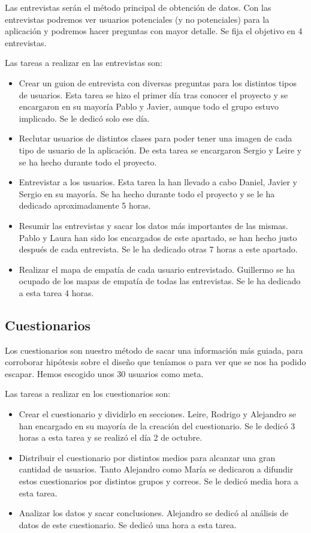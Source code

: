 Las entrevistas serán el método principal de obtención de datos. Con las entrevistas podremos ver usuarios potenciales (y no potenciales) para la aplicación y podremos hacer preguntas con mayor detalle. Se fija el objetivo en 4 entrevistas.

Las tareas a realizar en las entrevistas son:
\begin{itemize}
    \item Crear un guion de entrevista con diversas preguntas para los distintos tipos de usuarios. Esta tarea se hizo el primer día tras conocer el proyecto y se encargaron en su mayoría Pablo y Javier, aunque todo el grupo estuvo implicado. Se le dedicó solo ese día.
    \item Reclutar usuarios de distintos clases para poder tener una imagen de cada tipo de usuario de la aplicación. De esta tarea se encargaron Sergio y Leire y se ha hecho durante todo el proyecto.
    \item Entrevistar a los usuarios. Esta tarea la han llevado a cabo Daniel, Javier y Sergio en su mayoría. Se ha hecho durante todo el proyecto y se le ha dedicado aproximadamente 5 horas.
    \item Resumir las entrevistas y sacar los datos más importantes de las mismas. Pablo y Laura han sido los encargados de este apartado, se han hecho justo después de cada entrevista. Se le ha dedicado otras 7 horas a este apartado.
    \item Realizar el mapa de empatía de cada usuario entrevistado. Guillermo se ha ocupado de los mapas de empatía de todas las entrevistas. Se le ha dedicado a esta tarea 4 horas.
\end{itemize}

\subsection{Cuestionarios} \label{subsec:cuestionarios}

Los cuestionarios son nuestro método de sacar una información más guiada, para corroborar hipótesis sobre el diseño que teníamos o para ver que se nos ha podido escapar. Hemos escogido unos 30 usuarios como meta.

Las tareas a realizar en los cuestionarios son:
\begin{itemize}
    \item Crear el cuestionario y dividirlo en secciones. Leire, Rodrigo y Alejandro se han encargado en su mayoría de la creación del cuestionario. Se le dedicó 3 horas a esta tarea y se realizó el día 2 de octubre.
    \item Distribuir el cuestionario por distintos medios para alcanzar una gran cantidad de usuarios. Tanto Alejandro como María se dedicaron a difundir estos cuestionarios por distintos grupos y correos. Se le dedicó media hora a esta tarea.
    \item Analizar los datos y sacar conclusiones. Alejandro se dedicó al análisis de datos de este cuestionario. Se dedicó una hora a esta tarea.
\end{itemize}


